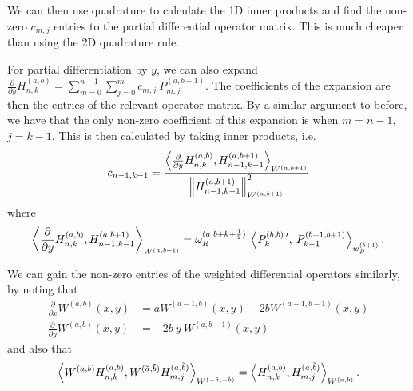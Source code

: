 \documentclass[11pt, oneside]{article}   	%
\newcommand{\half}{\frac{1}{2}}
\newcommand{\pddx}{\frac{\partial}{\partial x}}
\newcommand{\pddy}{\frac{\partial}{\partial y}}
\newcommand{\hdop}{H}
\newcommand{\hdopnkab}{\hdop_{n,k}^{(a,b)}}
\newcommand{\Wab}{{W^{(a,b)}}}
\newcommand{\hdopmj}{\hdop_{m,j}}
\newcommand{\genjac}{R}
\newcommand{\genjacw}{w_\genjac}
\newcommand{\normgenjac}{\omega_\genjac}
\begin{document}

We can then use quadrature to calculate the 1D inner products and find the non-zero $c_{m,j}$ entries to the partial differential operator matrix. This is much cheaper than using the 2D quadrature rule.

For partial differentiation by $y$, we can also expand $\pddy \hdopnkab = \sum_{m=0}^{n-1} \sum_{j=0}^m c_{m,j} \: P^{(a, b+1)}_{m,j}$. The coefficients of the expansion are then the entries of the relevant operator matrix. By a similar argument to before, we have that the only non-zero coefficient of this expansion is when $m = n-1$, $j = k-1$. This is then calculated by taking inner products, i.e. 
\begin{align*}
c_{n-1,k-1} = \frac{\ip<\pddy \hdopnkab, \hdop^{(a, b+1)}_{n-1,k-1} >_{W^{(a, b+1)}}}{\norm{\hdop^{(a, b+1)}_{n-1,k-1}}^2_{W^{(a, b+1)}}}
\end{align*}
where
\begin{align*}
	\ip<\pddy \hdopnkab, \hdop^{(a, b+1)}_{n-1,k-1} >_{W^{(a, b+1)}} = \normgenjac^{(a, b+k+\half)} \: \ip< P_k^{(b,b) \: \prime}, \: P_{k-1}^{(b+1,b+1)} >_{w_P^{(b+1)}}.
\end{align*}

We can gain the non-zero entries of the weighted differential operators similarly, by noting that
\begin{align}
	\pddx \Wab(x,y) &= a W^{(a-1, b)}(x,y) - 2bW^{(a+1, b-1)}(x,y) \label{eqn:weightderivativex} \\
	\pddy \Wab(x,y) &= -2b \: y \: W^{(a, b-1)}(x,y) \label{eqn:weightderivativey}
\end{align}
and also that
\begin{align*}
	\ip< \Wab \hdopnkab, W^{(\tilde{a},\tilde{b})} \hdopmj^{(\tilde{a},\tilde{b})} >_{W^{(-\tilde{a},-\tilde{b})}} = \ip< \hdopnkab, \hdopmj^{(\tilde{a},\tilde{b})} >_\Wab.
\end{align*}
\end{document}
